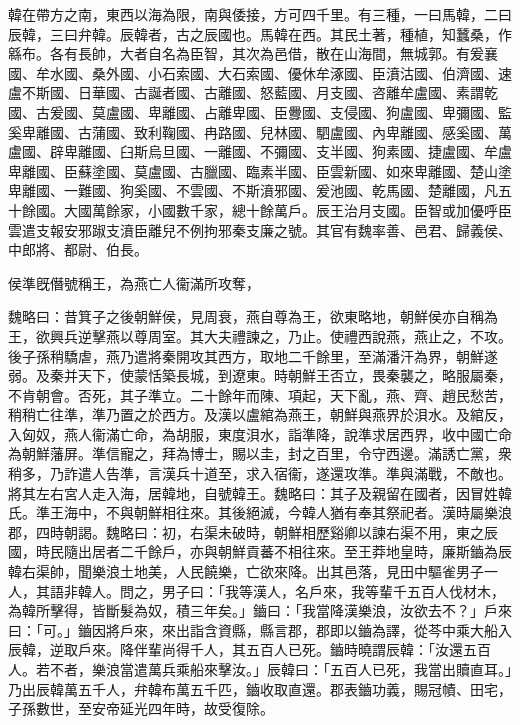 
\begin{pinyinscope}
韓在帶方之南，東西以海為限，南與倭接，方可四千里。有三種，一曰馬韓，二曰辰韓，三曰弁韓。辰韓者，古之辰國也。馬韓在西。其民土著，種植，知蠶桑，作緜布。各有長帥，大者自名為臣智，其次為邑借，散在山海間，無城郭。有爰襄國、牟水國、桑外國、小石索國、大石索國、優休牟涿國、臣濆沽國、伯濟國、速盧不斯國、日華國、古誕者國、古離國、怒藍國、月支國、咨離牟盧國、素謂乾國、古爰國、莫盧國、卑離國、占離卑國、臣釁國、支侵國、狗盧國、卑彌國、監奚卑離國、古蒲國、致利鞠國、冉路國、兒林國、駟盧國、內卑離國、感奚國、萬盧國、辟卑離國、臼斯烏旦國、一離國、不彌國、支半國、狗素國、捷盧國、牟盧卑離國、臣蘇塗國、莫盧國、古臘國、臨素半國、臣雲新國、如來卑離國、楚山塗卑離國、一難國、狗奚國、不雲國、不斯濆邪國、爰池國、乾馬國、楚離國，凡五十餘國。大國萬餘家，小國數千家，總十餘萬戶。辰王治月支國。臣智或加優呼臣雲遣支報安邪踧支濆臣離兒不例拘邪秦支廉之號。其官有魏率善、邑君、歸義侯、中郎將、都尉、伯長。

侯準旣僭號稱王，為燕亡人衞滿所攻奪，

魏略曰：昔箕子之後朝鮮侯，見周衰，燕自尊為王，欲東略地，朝鮮侯亦自稱為王，欲興兵逆擊燕以尊周室。其大夫禮諫之，乃止。使禮西說燕，燕止之，不攻。後子孫稍驕虐，燕乃遣將秦開攻其西方，取地二千餘里，至滿潘汗為界，朝鮮遂弱。及秦并天下，使蒙恬築長城，到遼東。時朝鮮王否立，畏秦襲之，略服屬秦，不肯朝會。否死，其子準立。二十餘年而陳、項起，天下亂，燕、齊、趙民愁苦，稍稍亡往準，準乃置之於西方。及漢以盧綰為燕王，朝鮮與燕界於浿水。及綰反，入匈奴，燕人衞滿亡命，為胡服，東度浿水，詣準降，說準求居西界，收中國亡命為朝鮮藩屏。準信寵之，拜為博士，賜以圭，封之百里，令守西邊。滿誘亡黨，衆稍多，乃詐遣人告準，言漢兵十道至，求入宿衞，遂還攻準。準與滿戰，不敵也。將其左右宮人走入海，居韓地，自號韓王。魏略曰：其子及親留在國者，因冒姓韓氏。準王海中，不與朝鮮相往來。其後絕滅，今韓人猶有奉其祭祀者。漢時屬樂浪郡，四時朝謁。魏略曰：初，右渠未破時，朝鮮相歷谿卿以諫右渠不用，東之辰國，時民隨出居者二千餘戶，亦與朝鮮貢蕃不相往來。至王莽地皇時，廉斯鑡為辰韓右渠帥，聞樂浪土地美，人民饒樂，亡欲來降。出其邑落，見田中驅雀男子一人，其語非韓人。問之，男子曰：「我等漢人，名戶來，我等輩千五百人伐材木，為韓所擊得，皆斷髮為奴，積三年矣。」鑡曰：「我當降漢樂浪，汝欲去不？」戶來曰：「可。」鑡因將戶來，來出詣含資縣，縣言郡，郡即以鑡為譯，從芩中乘大船入辰韓，逆取戶來。降伴輩尚得千人，其五百人已死。鑡時曉謂辰韓：「汝還五百人。若不者，樂浪當遣萬兵乘船來擊汝。」辰韓曰：「五百人已死，我當出贖直耳。」乃出辰韓萬五千人，弁韓布萬五千匹，鑡收取直還。郡表鑡功義，賜冠幘、田宅，子孫數世，至安帝延光四年時，故受復除。


\end{pinyinscope}
